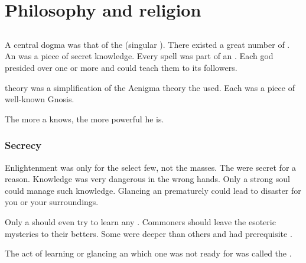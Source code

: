 \section{Philosophy and religion}









\subsection{\Arcana}
\index{\arcanum}
A central dogma was that of the \arcana (singular \arcanum). 
There existed a great number of \arcana. 
An \arcanum was a piece of secret knowledge. 
Every \rethyax spell was part of an \arcanum.
Each god presided over one or more \arcana and could teach them to its followers. 

\Arcanum theory was a simplification of the Aenigma theory the \dragons used. 
Each \arcanum was a piece of well-known Gnosis.

The more \arcana a \rethyax knows, the more powerful he is. 






\subsubsection{Secrecy}
Enlightenment was only for the select few, not the masses.
The \arcana were secret for a reason.
Knowledge was very dangerous in the wrong hands. 
Only a strong soul could manage such knowledge. 
Glancing an \arcanum prematurely could lead to disaster for you or your surroundings. 

Only a \rethyax should even try to learn any \arcana.
Commoners should leave the esoteric mysteries to their betters.
Some \arcana were deeper than others and had prerequisite \arcana. 

The act of learning or glancing an \arcanum which one was not ready for was called  the \arcanum. 

